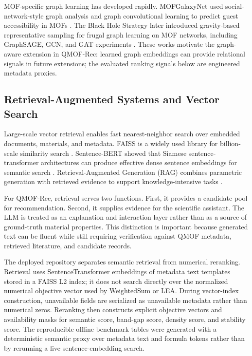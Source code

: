 \documentclass[12pt,a4paper]{article}
\begin{document}
MOF-specific graph learning has developed rapidly. MOFGalaxyNet used social-network-style graph analysis and graph convolutional learning to predict guest accessibility in MOFs \cite{jalali2023}. The Black Hole Strategy later introduced gravity-based representative sampling for frugal graph learning on MOF networks, including GraphSAGE, GCN, and GAT experiments \cite{jalali2025bh}. These works motivate the graph-aware extension in QMOF-Rec: learned graph embeddings can provide relational signals in future extensions; the evaluated ranking signals below are engineered metadata proxies.

\subsection{Retrieval-Augmented Systems and Vector Search}

Large-scale vector retrieval enables fast nearest-neighbor search over embedded documents, materials, and metadata. FAISS is a widely used library for billion-scale similarity search \cite{johnson2019}. Sentence-BERT showed that Siamese sentence-transformer architectures can produce effective dense sentence embeddings for semantic search \cite{reimers2019}. Retrieval-Augmented Generation (RAG) combines parametric generation with retrieved evidence to support knowledge-intensive tasks \cite{lewis2020}.

For QMOF-Rec, retrieval serves two functions. First, it provides a candidate pool for recommendation. Second, it supplies evidence for the scientific assistant. The LLM is treated as an explanation and interaction layer rather than as a source of ground-truth material properties. This distinction is important because generated text can be fluent while still requiring verification against QMOF metadata, retrieved literature, and candidate records.

The deployed repository separates semantic retrieval from numerical reranking. Retrieval uses SentenceTransformer embeddings of metadata text templates stored in a FAISS L2 index; it does not search directly over the normalized numerical objective vector used by WeightedSum or LEA. During vector-index construction, unavailable fields are serialized as unavailable metadata rather than numerical zeros. Reranking then constructs explicit objective vectors and availability masks for semantic score, band-gap score, density score, and stability score. The reproducible offline benchmark tables were generated with a deterministic semantic proxy over metadata text and formula tokens rather than by rerunning a live sentence-embedding search.
\end{document}

